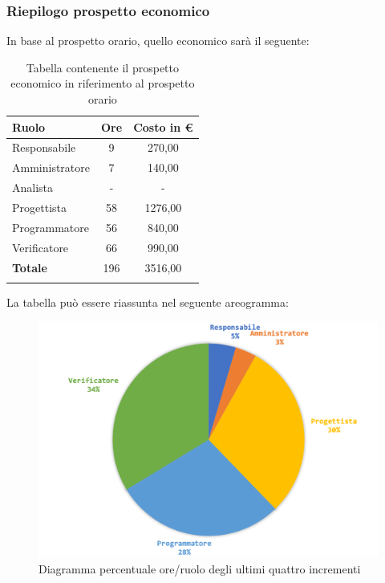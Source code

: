 	\subsubsection{Riepilogo prospetto economico}
	In base al prospetto orario, quello economico sarà il seguente: 
	
	\begin{longtable}{|l|c|c|}
		\hline
		\rowcolor{lighter-grayer}
		\textbf{Ruolo} & \textbf{Ore} & \textbf{Costo in € } \\
		\hline
		\endfirsthead
		
		\hline
		Responsabile 	    & 9 & 270,00\\
		\hline 
		\hline
		Amministratore	   & 7 & 140,00\\
		\hline
		\hline
		Analista 				& - & -\\
		\hline
		\hline
		Progettista 		   & 58 & 1276,00\\
		\hline
		\hline
		Programmatore 	  & 56 & 840,00\\
		\hline
		\hline
		Verificatore 		   & 66 & 990,00\\
		\hline
		\textbf{Totale} 	 & 196 & 3516,00\\
		\hline
		\caption{Tabella contenente il prospetto economico in riferimento al prospetto orario}
	\end{longtable}
	
	La tabella può essere riassunta nel seguente areogramma:
	\begin{figure}[H]
		\centering
		\includegraphics[width=0.8\linewidth]{./images/preventivo/incremento9-12-2.png}
		\caption{Diagramma percentuale ore/ruolo degli ultimi quattro incrementi}
		\label{fig:diagramma costi ruolo incrementi IX-XII}
	\end{figure}
	\pagebreak
	
